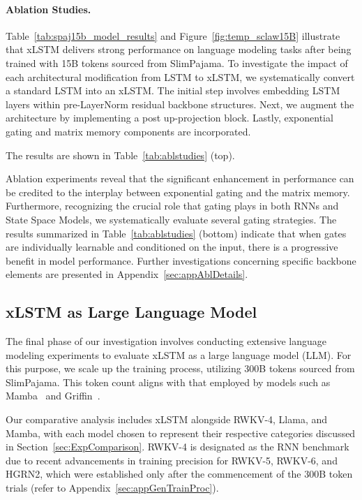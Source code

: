\paragraph{Ablation Studies.}
Table~\ref{tab:spaj15b_model_results} and Figure~\ref{fig:temp_sclaw15B} illustrate that xLSTM delivers strong performance on language modeling tasks after being trained with 15B tokens sourced from SlimPajama. To investigate the impact of each architectural modification from LSTM to xLSTM, we systematically convert a standard LSTM into an xLSTM. The initial step involves embedding LSTM layers within pre-LayerNorm residual backbone structures. Next, we augment the architecture by implementing a post up-projection block. Lastly, exponential gating and matrix memory components are incorporated.

The results are shown in Table~\ref{tab:ablstudies} (top). 

Ablation experiments reveal that the significant enhancement in performance can be credited to the interplay between exponential gating and the matrix memory. Furthermore, recognizing the crucial role that gating plays in both RNNs and State Space Models, we systematically evaluate several gating strategies. The results summarized in Table~\ref{tab:ablstudies} (bottom) indicate that when gates are individually learnable and conditioned on the input, there is a progressive benefit in model performance. Further investigations concerning specific backbone elements are presented in Appendix~\ref{sec:appAblDetails}.

\subsection{xLSTM as Large Language Model}
\label{sec:ExpLanguage}

The final phase of our investigation involves conducting extensive language modeling experiments to evaluate xLSTM as a large language model (LLM). For this purpose, we scale up the training process, utilizing 300B tokens sourced from SlimPajama. This token count aligns with that employed by models such as Mamba~\citep{Gu:24arxiv} and Griffin~\citep{De:24arxiv}.

Our comparative analysis includes xLSTM alongside RWKV-4, Llama, and Mamba, with each model chosen to represent their respective categories discussed in Section~\ref{sec:ExpComparison}. RWKV-4 is designated as the RNN benchmark due to recent advancements in training precision for RWKV-5, RWKV-6, and HGRN2, which were established only after the commencement of the 300B token trials (refer to Appendix~\ref{sec:appGenTrainProc}).


